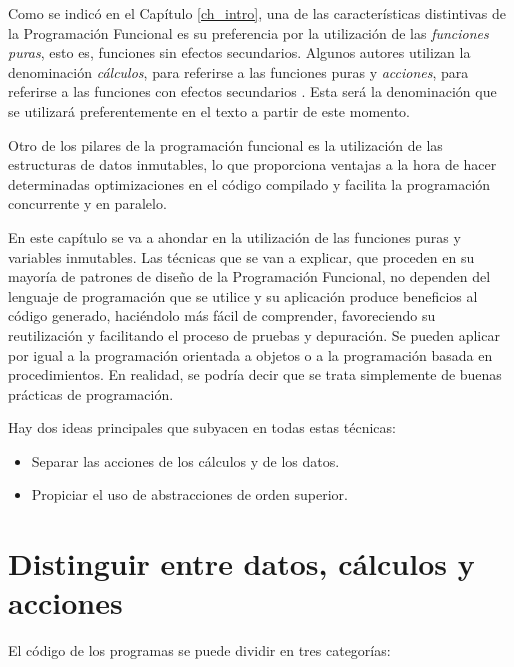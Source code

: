 \begin{Resumen}
   Como se indicó en el Capítulo \ref{ch_intro}, una de las características distintivas de la Programación Funcional es su preferencia por la utilización de las \textit{funciones puras}, esto es, funciones sin efectos secundarios. Algunos autores utilizan la denominación \textit{cálculos}, para referirse a las funciones puras y \textit{acciones}, para referirse a las funciones con efectos secundarios \citep{normandGrokkingSimplicityTaming2021}. Esta será la denominación que se utilizará preferentemente en el texto a partir de este momento.
   
   \smallskip
   
   Otro de los pilares de la programación funcional es la utilización de las estructuras de datos inmutables, lo que proporciona ventajas a la hora de hacer determinadas optimizaciones en el código compilado y facilita la programación concurrente y en paralelo. 
   
   \smallskip
   
   En este capítulo se va a ahondar en la utilización de las funciones puras y variables inmutables. Las técnicas que se van a explicar, que proceden en su mayoría de patrones de diseño de la Programación Funcional, no dependen del lenguaje de programación que se utilice y su aplicación  produce beneficios al código generado, haciéndolo más fácil de comprender, favoreciendo su reutilización y facilitando el proceso de pruebas y depuración. Se pueden aplicar por igual a la programación orientada a objetos o a la programación basada en procedimientos. En realidad, se podría decir que se trata simplemente de buenas prácticas de programación.
   
   \smallskip
   
   Hay dos ideas principales que subyacen en todas estas técnicas:
   
   \begin{itemize}
      \item Separar las acciones de los cálculos y de los datos.
      \item Propiciar el uso de abstracciones de orden superior.
   \end{itemize}
   
\end{Resumen}

\section{Distinguir entre datos, cálculos y acciones}
\noindent El código de los programas se puede dividir en tres categorías: 


